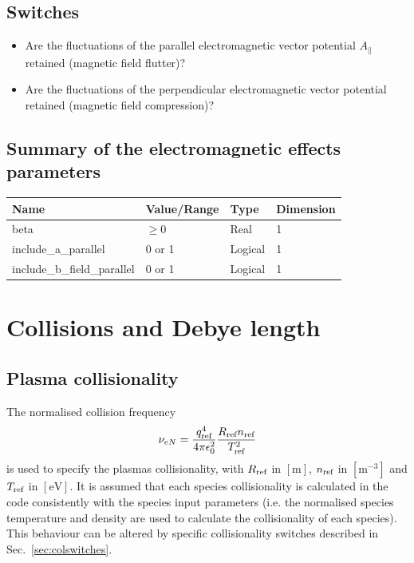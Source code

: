 \documentclass[fleqn]{report}
\begin{document}
\subsection{Switches}
\begin{itemize}
\item Are the fluctuations of the parallel electromagnetic vector potential $A_\parallel$ retained (magnetic field flutter)?
\item Are the fluctuations of the perpendicular electromagnetic vector potential retained (magnetic field compression)?
\end{itemize}

\subsection{Summary of the electromagnetic effects parameters}
\begin{tabularx}{\textwidth}{|X|Y|Y|Y|}
\hline
Name & Value/Range & Type & Dimension \\
\hline
beta & $\geq 0$ & Real & 1 \\
include\_a\_parallel & 0 or 1 & Logical & 1 \\
include\_b\_field\_parallel & 0 or 1 & Logical & 1 \\
\hline
\end{tabularx}

\section{Collisions and Debye length}
\subsection{Plasma collisionality}
The normalised collision frequency
\begin{equation}
 \nu_{eN} = \frac{q_{\textrm{ref}}^4}{4\pi\epsilon_0^2}\frac{R_{\textrm{ref}} n_{\textrm{ref}}}{T_{\textrm{ref}}^2}
\end{equation}
is used to specify the plasmas collisionality, with $R_{\textrm{ref}}$ in $[\textrm{m}]$, $n_{\textrm{ref}}$ in $[\textrm{m}^{-3}]$ and $T_{\textrm{ref}}$ in $[\textrm{eV}]$. It is assumed that each species collisionality is calculated in the code consistently with the species input parameters (i.e. the normalised species temperature and density are used to calculate the collisionality of each species). This behaviour can be altered by specific collisionality switches described in Sec.~\ref{sec:colswitches}.\\
\end{document}
